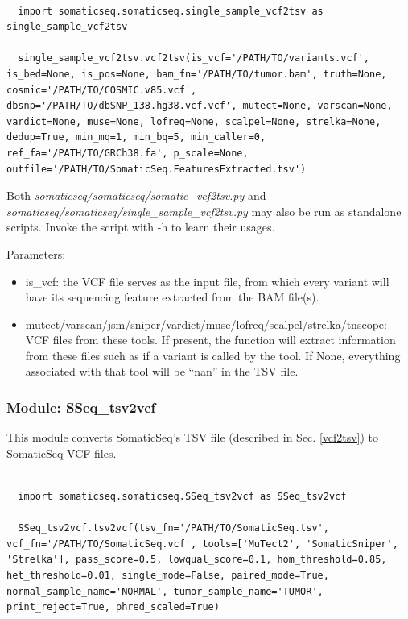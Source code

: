 \documentclass[10pt,letterpaper]{article}
\begin{document}
\begin{sloppypar}
\begin{lstlisting}

  import somaticseq.somaticseq.single_sample_vcf2tsv as single_sample_vcf2tsv
  
  single_sample_vcf2tsv.vcf2tsv(is_vcf='/PATH/TO/variants.vcf', is_bed=None, is_pos=None, bam_fn='/PATH/TO/tumor.bam', truth=None, cosmic='/PATH/TO/COSMIC.v85.vcf', dbsnp='/PATH/TO/dbSNP_138.hg38.vcf.vcf', mutect=None, varscan=None, vardict=None, muse=None, lofreq=None, scalpel=None, strelka=None, dedup=True, min_mq=1, min_bq=5, min_caller=0, ref_fa='/PATH/TO/GRCh38.fa', p_scale=None, outfile='/PATH/TO/SomaticSeq.FeaturesExtracted.tsv')

\end{lstlisting}

Both \textit{somaticseq/somaticseq/somatic\_vcf2tsv.py} and \textit{somaticseq/somaticseq/single\_sample\_vcf2tsv.py} may also be run as standalone scripts. Invoke the script with -h to learn their usages. 


Parameters:

\begin{itemize}

\item is\_vcf: the VCF file serves as the input file, from which every variant will have its sequencing feature extracted from the BAM file(s). 

\item mutect/varscan/jsm/sniper/vardict/muse/lofreq/scalpel/strelka/tnscope: VCF files from these tools. If present, the function will extract information from these files such as if a variant is called by the tool. If None, everything associated with that tool will be ``nan'' in the TSV file.

\end{itemize}






\subsubsection{Module: SSeq\_tsv2vcf}

This module converts SomaticSeq's TSV file (described in Sec. \ref{vcf2tsv}) to SomaticSeq VCF files.


\begin{lstlisting}

  import somaticseq.somaticseq.SSeq_tsv2vcf as SSeq_tsv2vcf
  
  SSeq_tsv2vcf.tsv2vcf(tsv_fn='/PATH/TO/SomaticSeq.tsv', vcf_fn='/PATH/TO/SomaticSeq.vcf', tools=['MuTect2', 'SomaticSniper', 'Strelka'], pass_score=0.5, lowqual_score=0.1, hom_threshold=0.85, het_threshold=0.01, single_mode=False, paired_mode=True, normal_sample_name='NORMAL', tumor_sample_name='TUMOR', print_reject=True, phred_scaled=True)
  

\end{lstlisting}
\end{sloppypar}
\end{document}
